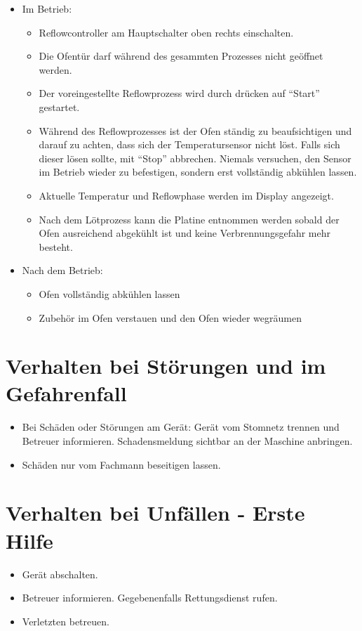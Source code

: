 \documentclass[fontsize=9pt]{scrartcl}
\newenvironment{smallitemize}{\begin{itemize}\itemsep -3pt}{\end{itemize}}
\begin{document}
\begin{itemize}
\begin{smallitemize}
	\end{smallitemize}
	\item Im Betrieb:
	\begin{smallitemize}
		\item Reflowcontroller am Hauptschalter oben rechts einschalten.
		\item Die Ofentür darf während des gesammten Prozesses nicht geöffnet werden.
		\item Der voreingestellte Reflowprozess wird durch drücken auf \enquote{Start} gestartet.
		\item Während des Reflowprozesses ist der Ofen ständig zu beaufsichtigen und darauf zu achten, dass sich der Temperatursensor nicht löst. Falls sich dieser lösen sollte, mit \enquote{Stop} abbrechen. Niemals versuchen, den Sensor im Betrieb wieder zu befestigen, sondern erst vollständig abkühlen lassen.
		\item Aktuelle Temperatur und Reflowphase werden im Display angezeigt.
		\item Nach dem Lötprozess kann die Platine entnommen werden sobald der Ofen ausreichend abgekühlt ist und keine Verbrennungsgefahr mehr besteht.
		\end{smallitemize}
	\item Nach dem Betrieb:
	\begin{smallitemize}
		\item Ofen vollständig abkühlen lassen
		\item Zubehör im Ofen verstauen und den Ofen wieder wegräumen
	\end{smallitemize}

\end{itemize}

\section{Verhalten bei Störungen und im Gefahrenfall}
\begin{smallitemize}
	\item Bei Schäden oder Störungen am Gerät: Gerät vom Stomnetz trennen und Betreuer informieren. Schadensmeldung sichtbar an der Maschine anbringen.
	\item Schäden nur vom Fachmann beseitigen lassen.
\end{smallitemize}

\section{Verhalten bei Unfällen - Erste Hilfe}
\begin{smallitemize}
	\item Gerät abschalten. 
	\item Betreuer informieren. Gegebenenfalls Rettungsdienst rufen.
	\item Verletzten betreuen.
\end{smallitemize}
\end{document}
